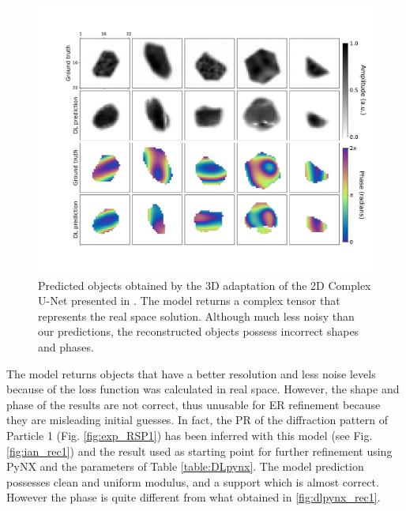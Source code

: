 \begin{figure}[H]
    \centering
    \includegraphics[width=\textwidth]{figures/Phasing/sim_obj_Ian.pdf}
    \caption{Predicted objects obtained by the 3D adaptation of the 2D Complex U-Net presented in \cite{yu_ultrafast_2024}.
    The model returns a complex tensor that represents the real space solution. Although much less noisy than our predictions, 
    the reconstructed objects possess incorrect shapes and phases. }
    \label{fig:Ian_objs}
\end{figure}

The model returns objects that have a better resolution and less noise levels because of the loss function was calculated in 
real space. However, the shape and phase of the results are not correct, thus unusable for ER refinement because they 
are misleading initial guesses. 
In fact, the PR of the diffraction pattern of Particle 1 (Fig. \ref{fig:exp_RSP1}) has been 
inferred with this model (see Fig. \ref{fig:ian_rec1}) and the result used as starting point for further refinement 
using PyNX and the parameters of Table \ref{table:DLpynx}. The model prediction possesses clean and uniform modulus, 
and a support which is almost correct. However the phase is quite different from what obtained in \ref{fig:dlpynx_rec1}. 

